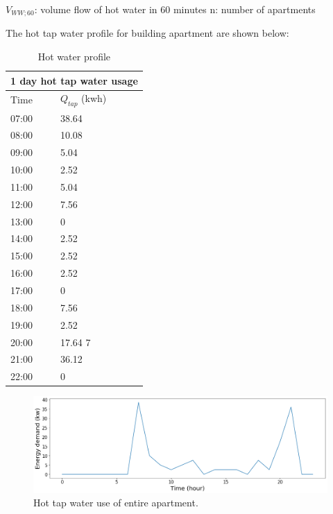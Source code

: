 \documentclass[a4paper,10pt]{article}
\begin{document}
$V_{WW;60}$: volume flow of hot water in 60 minutes
n: number of apartments

The hot tap water profile for building apartment are shown below:

\begin{table}[h!]
\centering
\begin{tabular}{|p{3cm}|p{3cm}|}
\hline
\multicolumn{2}{|c|}{1 day hot tap water usage} \\
\hline
Time& $Q_{tap}$ (kwh)\\ %
 \hline
 07:00	& 38.64   \\ %
 08:00  & 10.08   \\ %
 09:00	& 5.04    \\ %
 10:00  & 2.52    \\ %
 11:00  & 5.04    \\ %
 12:00  & 7.56    \\ %
 13:00  & 0         \\ %
 14:00  & 2.52   \\ %
 15:00  & 2.52   \\ %
 16:00  & 2.52   \\ %
 17:00  & 0        \\ %
 18:00  & 7.56   \\ %
 19:00  & 2.52  \\ %
 20:00  & 17.64 7\\ %
 21:00  & 36.12 \\ %
 22:00  & 0        \\ %

  \hline
 \end{tabular}
 \caption{Hot water profile}

 \end{table}


\begin{figure}[H]
\centering
\includegraphics[width=1\columnwidth]{pictures/tap water profile of 24 apartments.png}
\caption[Short title]{Hot tap water use of entire apartment.}
\label{fig:ff11}\end{figure}
\end{document}
